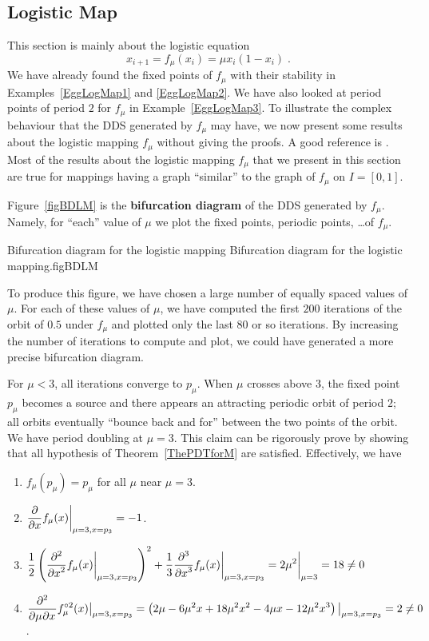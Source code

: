 \subsection{Logistic Map}

This section is mainly about the logistic equation
\[
x_{i+1} = f_\mu(x_i) = \mu x_i (1-x_i) \; .
\]
We have already found the fixed points of $f_\mu$ with their stability
in Examples~\ref{EggLogMap1} and \ref{EggLogMap2}.  We have also
looked at period points of period $2$ for $f_\mu$ in
Example~\ref{EggLogMap3}.  To illustrate the complex behaviour that
the DDS generated by $f_\mu$ may have, we now present some results
about the logistic mapping $f_\mu$ without giving the proofs.  A good
reference is \cite{D}.  Most of the results about the logistic mapping
$f_\mu$ that we present in this section are true for mappings having a
graph ``similar'' to the graph of $f_\mu$ on $I=[0,1]$.

Figure~\ref{figBDLM} is the
{\bfseries bifurcation diagram} of the DDS
generated by $f_\mu$.  Namely, for ``each'' value of $\mu$ we plot the fixed
points, periodic points, \ldots of $f_\mu$.

{Bifurcation diagram for the logistic mapping}
{Bifurcation diagram for the logistic mapping.}{figBDLM}

To produce this figure, we have chosen a large number
of equally spaced values of $\mu$.  For each of these values of $\mu$,
we have computed the first $200$ iterations of the orbit of $0.5$
under $f_\mu$ and plotted only the last $80$ or so iterations.  By
increasing the number of iterations to compute and plot, we could have
generated a more precise bifurcation diagram.

For $\mu<3$, all iterations converge to $p_\mu$.   When
$\mu$ crosses above $3$, the fixed point $p_\mu$ becomes a
source and there appears an attracting  periodic orbit of period $2$;
all orbits eventually ``bounce back and for'' between the two
points of the orbit.  We have period doubling at $\mu=3$.  This claim
can be rigorously prove by showing that all hypothesis of
Theorem~\ref{ThePDTforM} are satisfied.  Effectively, we have
\begin{enumerate}
\item $f_\mu(p_\mu) = p_\mu$ for all $\mu$ near $\mu=3$.
\item $\DS \pdfdx{f_\mu(x)}{x} \bigg|_{\mu=3,x=p_3} = -1$.
\item
$\DS \frac{1}{2}
\left(\pdfdxn{f_{\mu}(x)}{x}{2}\bigg|_{\mu=3,x=p_3}\right)^2
+\frac{1}{3} \pdfdxn{f_{\mu}(x)}{x}{3}\bigg|_{\mu=3,x=p_3}
= 2\mu^2 \bigg|_{\mu=3} = 18 \neq 0$
\item $\DS \pdfdxnm{f_\mu^{\circ 2}(x) }{\mu}{x}{2}{}{}\big|_{\mu=3,x=p_3} =
\left( 2\mu - 6\mu^2 x+18\mu^2 x^2 - 4\mu x -
12\mu^2 x^3\right)\big|_{\mu=3,x=p_3}
= 2 \not=0$.
\end{enumerate}

